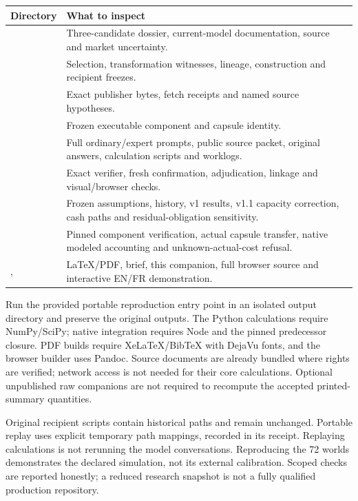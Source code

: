 \documentclass[10pt]{article}
\begin{document}
\begin{tabularx}{\textwidth}{p{}Y}
\toprule Directory & What to inspect\\\midrule
{} & Three-candidate dossier, current-model documentation, source and market uncertainty.\\
 & Selection, transformation witnesses, lineage, construction and recipient freezes.\\
 & Exact publisher bytes, fetch receipts and named source hypotheses.\\
 & Frozen executable component and capsule identity.\\
 & Full ordinary/expert prompts, public source packet, original answers, calculation scripts and worklogs.\\
 & Exact verifier, fresh confirmation, adjudication, linkage and visual/browser checks.\\
 & Frozen assumptions, history, v1 results, v1.1 capacity correction, cash paths and residual-obligation sensitivity.\\
 & Pinned component verification, actual capsule transfer, native modeled accounting and unknown-actual-cost refusal.\\
,  & LaTeX/PDF, brief, this companion, full browser source and interactive EN/FR demonstration.\\\bottomrule
\end{tabularx}

Run the provided portable reproduction entry point in an isolated output directory and preserve the original outputs. The Python calculations require NumPy/SciPy; native integration requires Node and the pinned predecessor closure. PDF builds require XeLaTeX/BibTeX with DejaVu fonts, and the browser builder uses Pandoc. Source documents are already bundled where rights are verified; network access is not needed for their core calculations. Optional unpublished raw companions are not required to recompute the accepted printed-summary quantities.

Original recipient scripts contain historical paths and remain unchanged. Portable replay uses explicit temporary path mappings, recorded in its receipt. Replaying calculations is not rerunning the model conversations. Reproducing the 72 worlds demonstrates the declared simulation, not its external calibration. Scoped checks are reported honestly; a reduced research snapshot is not a fully qualified production repository.
\end{document}
